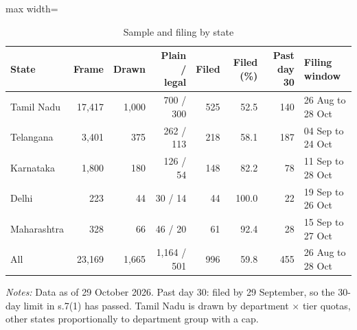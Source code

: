 \begin{table}[!htbp]
\centering
\caption{Sample and filing by state}
\label{tab:tab_sample}
\small
\begin{adjustbox}{max width=\textwidth}
\begin{threeparttable}
\begin{tabular}{lrrrrrrl}
\toprule
State & Frame & Drawn & Plain / legal & Filed & Filed (\%) & Past day 30 & Filing window \\
\midrule
Tamil Nadu & 17,417 & 1,000 & 700 / 300 & 525 & 52.5 & 140 & 26 Aug to 28 Oct \\
Telangana & 3,401 & 375 & 262 / 113 & 218 & 58.1 & 187 & 04 Sep to 24 Oct \\
Karnataka & 1,800 & 180 & 126 / 54 & 148 & 82.2 & 78 & 11 Sep to 28 Oct \\
Delhi & 223 & 44 & 30 / 14 & 44 & 100.0 & 22 & 19 Sep to 26 Oct \\
Maharashtra & 328 & 66 & 46 / 20 & 61 & 92.4 & 28 & 15 Sep to 27 Oct \\
\midrule
All & 23,169 & 1,665 & 1,164 / 501 & 996 & 59.8 & 455 & 26 Aug to 28 Oct \\
\bottomrule
\end{tabular}
\begin{tablenotes}[flushleft]\footnotesize
\item \textit{Notes:} Data as of 29 October 2026. Past day 30: filed by 29 September, so the 30-day limit in s.7(1) has passed. Tamil Nadu is drawn by department $\times$ tier quotas, other states proportionally to department group with a cap.
\end{tablenotes}
\end{threeparttable}
\end{adjustbox}
\end{table}
